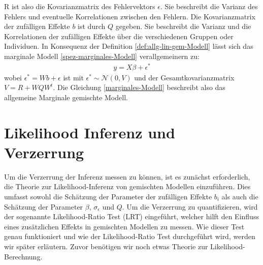 \documentclass[%
thesis=student,%
coverpage=false,%
titlepage=false,%
headmarks=true, %
german,%
font=libertine, %
math=newpxtx, %
BCOR=5mm,%
coverBCOR=11mm%
]{tumbook}
\theoremstyle{break}
\begin{document}
R ist also die Kovarianzmatrix des Fehlervektors $\epsilon$. Sie beschreibt die Varianz des Fehlers und eventuelle Korrelationen zwischen den Fehlern. Die Kovarianzmatrix der zufälligen Effekte $b$ ist durch $Q$ gegeben. Sie beschreibt die Varianz und die Korrelationen der zufälligen Effekte über die verschiedenen Gruppen oder Individuen.
In Konsequenz der Definition \ref{def:allg-lin-gem-Modell} lässt sich das marginale Modell \ref{spez-marginales-Modell} verallgemeinern zu: 
\begin{align}	
	y = X\beta + \epsilon^* \label{marginales-Modell}
\end{align}
wobei $\epsilon^* = Wb + \epsilon$ ist mit $\epsilon^* \sim \mathcal{N}(0,V)$ und der Gesamtkovarianzmatrix $V= R + WQW^t$. Die Gleichung \ref{marginales-Modell} beschreibt also das allgemeine Marginale gemischte Modell.


\section{Likelihood Inferenz und Verzerrung}
Um die Verzerrung der Inferenz messen zu können, ist es zunächst erforderlich, die Theorie zur Likelihood-Inferenz von gemischten Modellen einzuführen. Dies umfasst sowohl die Schätzung der Parameter der zufälligen Effekte $b_i$ als auch die Schätzung der Parameter $\beta$, $\sigma_\epsilon$ und $Q$. Um die Verzerrung zu quantifizieren, wird der sogenannte Likelihood-Ratio Test (LRT) eingeführt, welcher hilft den Einfluss eines zusätzlichen Effekts in gemischten Modellen zu messen.
Wie dieser Test genau funktioniert und wie der Likelihood-Ratio Test durchgeführt wird, werden wir später erläutern. Zuvor benötigen wir noch etwas Theorie zur Likelihood-Berechnung.
\end{document}
